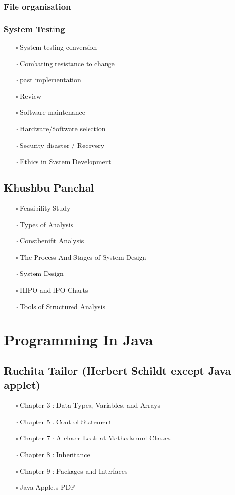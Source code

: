 \documentclass[11pt]{article}
\begin{document}
\subsubsection{File organisation}
\label{sec:orgf25cc27}
\subsubsection{System Testing}
\label{sec:orgdbde862}
\begin{itemize}
\item[{$\square$}] System testing conversion
\item[{$\square$}] Combating resistance to change
\item[{$\square$}] past implementation
\item[{$\square$}] Review
\item[{$\square$}] Software maintenance
\item[{$\square$}] Hardware/Software selection
\item[{$\square$}] Security disaster / Recovery
\item[{$\square$}] Ethics in System Development
\end{itemize}

\subsection{Khushbu Panchal}
\label{sec:org02c4053}
\begin{itemize}
\item[{$\square$}] Feasibility Study
\item[{$\square$}] Types of Analysis
\item[{$\square$}] Constbenifit Analysis
\item[{$\square$}] The Process And Stages of System Design
\item[{$\square$}] System Design
\item[{$\square$}] HIPO and IPO Charts
\item[{$\square$}] Tools of Structured Analysis
\end{itemize}

\section{Programming In Java}
\label{sec:orgbed6373}
\subsection{Ruchita Tailor (Herbert Schildt except Java applet)}
\label{sec:org99314b0}
\begin{itemize}
\item[{$\square$}] Chapter 3 : Data Types, Variables, and Arrays
\item[{$\square$}] Chapter 5 : Control Statement
\item[{$\square$}] Chapter 7 : A closer Look at Methods and Classes
\item[{$\square$}] Chapter 8 : Inheritance
\item[{$\square$}] Chapter 9 : Packages and Interfaces
\item[{$\square$}] Java Applets PDF
\end{itemize}
\end{document}
